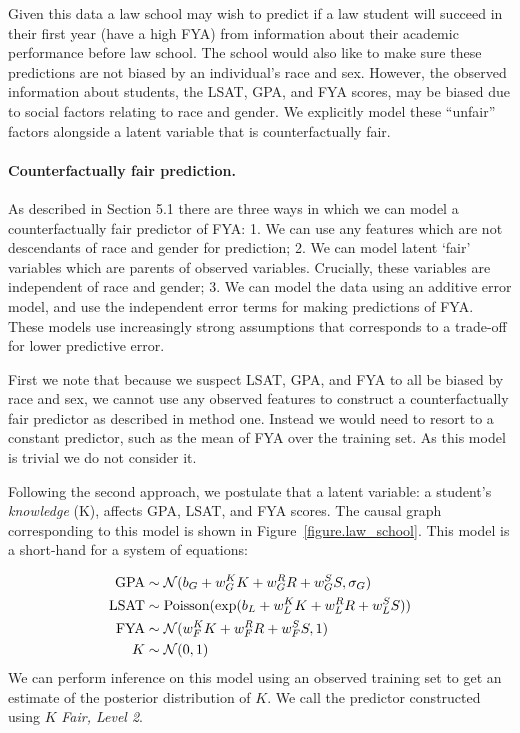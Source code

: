 Given this data a law school may wish to predict if a law student
will succeed in their first year (have a high FYA) from information about their academic performance 
before law school. The school would also like to make sure
these predictions are not biased by an individual's race and
sex. However, the observed information about
students, the LSAT, GPA, and FYA scores,  may be biased due to 
social factors relating to race and gender. We explicitly model these
``unfair'' factors alongside a latent variable that is counterfactually
fair.

\paragraph{Counterfactually fair prediction.}
As described in Section 5.1 there are three ways in which we can model a counterfactually fair predictor of FYA: 1. We can use any features which are not descendants of race and gender for prediction; 2. We can model latent `fair' variables which are parents of observed variables. Crucially, these variables are independent of race and gender; 3. We can model the data using an additive error model, and use the independent error terms for making predictions of FYA. These models use increasingly strong assumptions that corresponds to a trade-off for lower predictive error.

First we note that because we suspect LSAT, GPA, and FYA to all be biased by race and sex, we cannot use any observed features to construct a counterfactually fair predictor as described in method one. Instead we would need to resort to a constant predictor, such as the mean of FYA over the training set. As this model is trivial we do not consider it. 

Following the second approach, we postulate that a latent variable: a student's \emph{knowledge} (K), affects GPA, LSAT, and FYA scores. The causal graph corresponding to this model is shown in Figure~\ref{figure.law_school}. This model is a short-hand for a system of equations:

\begin{align}
\mbox{GPA} &\sim {\cal N}(b_{G} + w_{G}^K K + w_{G}^R R + w_{G}^S S, \sigma_{G}) \nonumber \\
\mbox{LSAT} &\sim \textrm{Poisson}(\exp(b_{L} + w_{L}^K K + w_{L}^R R + w_{L}^S S)) \nonumber \\
\mbox{FYA} &\sim {\cal N}(w_{F}^K K + w_{F}^R R + w_{F}^S S, 1) \nonumber \\
K &\sim {\cal N}(0,1) \nonumber
\end{align}
We can perform inference on this model using an observed training set to get an estimate of the posterior distribution of $K$. We call the predictor constructed using $K$ \emph{Fair, Level 2}.

